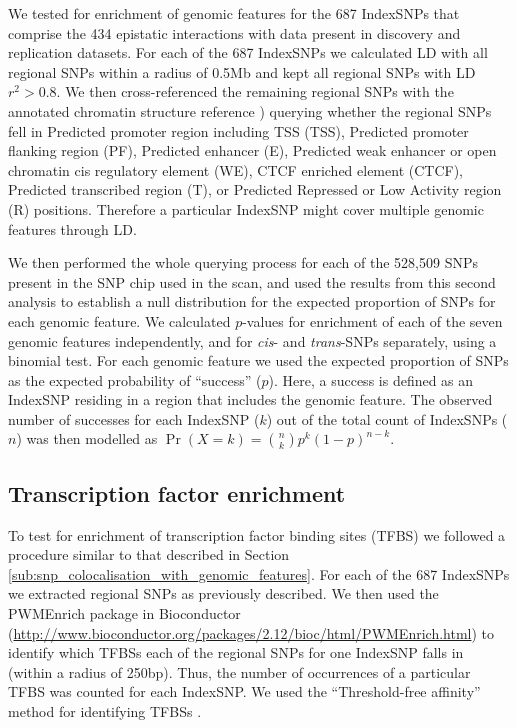 \documentclass{article}
\begin{document}
We tested for enrichment of genomic features for the 687 IndexSNPs that comprise the 434 epistatic interactions with data present in discovery and replication datasets. For each of the 687 IndexSNPs we calculated LD with all regional SNPs within a radius of 0.5Mb and kept all regional SNPs with LD $r^{2} > 0.8$. We then cross-referenced the remaining regional SNPs with the annotated chromatin structure reference \cite{Hoffman2012}) querying whether the regional SNPs fell in Predicted promoter region including TSS (TSS), Predicted promoter flanking region (PF), Predicted enhancer (E), Predicted weak enhancer or open chromatin cis regulatory element (WE), CTCF enriched element (CTCF), Predicted transcribed region (T), or Predicted Repressed or Low Activity region (R) positions. Therefore a particular IndexSNP might cover multiple genomic features through LD.

We then performed the whole querying process for each of the 528,509 SNPs present in the SNP chip used in the scan, and used the results from this second analysis to establish a null distribution for the expected proportion of SNPs for each genomic feature. We calculated $p$-values for enrichment of each of the seven genomic features independently, and for \emph{cis}- and \emph{trans}-SNPs separately, using a binomial test. For each genomic feature we used the expected proportion of SNPs as the expected probability of ``success'' ($p$). Here, a success is defined as an IndexSNP residing in a region that includes the genomic feature. The observed number of successes for each IndexSNP ($k$) out of the total count of IndexSNPs ($n$) was then modelled as $\Pr (X = k) = {n \choose k} p^{k}(1-p)^{n-k}$.



\subsection{Transcription factor enrichment}

To test for enrichment of transcription factor binding sites (TFBS) we followed a procedure similar to that described in Section \ref{sub:snp_colocalisation_with_genomic_features}. For each of the 687 IndexSNPs we extracted regional SNPs as previously described. We then used the PWMEnrich package in Bioconductor (\url{http://www.bioconductor.org/packages/2.12/bioc/html/PWMEnrich.html}) to identify which TFBSs each of the regional SNPs for one IndexSNP falls in (within a radius of 250bp). Thus, the number of occurrences of a particular TFBS was counted for each IndexSNP. We used the ``Threshold-free affinity'' method for identifying TFBSs \cite{Stormo2000}.
\end{document}
